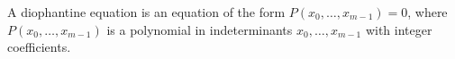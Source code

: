 A diophantine equation is an equation of the form $P(x_0, \ldots, x_{m-1}) = 0$, where $P(x_0, \ldots, x_{m-1})$ is a polynomial in indeterminants $x_0, \ldots, x_{m-1}$ with integer coefficients.